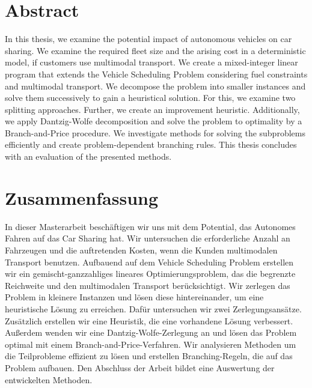 \cleardoublepage

\section*{Abstract}

In this thesis, we examine the potential impact of autonomous vehicles on car sharing. We examine the required fleet size and the arising cost in a deterministic model, if customers use multimodal transport. We create a mixed-integer linear program that extends the Vehicle Scheduling Problem considering fuel constraints and multimodal transport. We decompose the problem into smaller instances and solve them successively to gain a heuristical solution. For this, we examine two splitting approaches. Further, we create an improvement heuristic. Additionally, we apply Dantzig-Wolfe decomposition and solve the problem to optimality by a Branch-and-Price procedure. We investigate methods for solving the subproblems efficiently and create problem-dependent branching rules. This thesis concludes with an evaluation of the presented methods.

\section*{Zusammenfassung}

In dieser Masterarbeit beschäftigen wir uns mit dem Potential, das Autonomes Fahren auf das Car Sharing hat. Wir untersuchen die erforderliche Anzahl an Fahrzeugen und die auftretenden Kosten, wenn die Kunden multimodalen Transport benutzen. Aufbauend auf dem Vehicle Scheduling Problem erstellen wir ein gemischt-ganzzahliges lineares Optimierungsproblem, das die begrenzte Reichweite und den multimodalen Transport berücksichtigt. Wir zerlegen das Problem in kleinere Instanzen und lösen diese hintereinander, um eine heuristische Lösung zu erreichen. Dafür untersuchen wir zwei Zerlegungsansätze. Zusätzlich erstellen wir eine Heuristik, die eine vorhandene Lösung verbessert. Außerdem wenden wir eine Dantzig-Wolfe-Zerlegung an und lösen das Problem optimal mit einem Branch-and-Price-Verfahren. Wir analysieren Methoden um die Teilprobleme effizient zu lösen und erstellen Branching-Regeln, die auf das Problem aufbauen. Den Abschluss der Arbeit bildet eine Auswertung der entwickelten Methoden.

